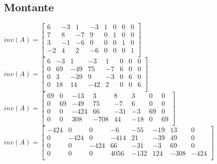 \documentclass[12pt,a4paper,final]{article}
\begin{document}
\subsection{Montante}
$
inv(A)=
\left[\begin{matrix}
6 & -3 & 1 & -3 & 1 & 0 & 0 & 0 \\
7 & 8 & -7 &  9& 0 & 1 & 0 & 0\\
3 & -1 & -6 & 0& 0 & 0 & 1 & 0 \\
-2 & 4 & 2 & -6 & 0 & 0 & 0 & 1\\
\end{matrix}\right]
$
\newline \newline
\newline \newline
$
inv(A)=
\left[\begin{matrix}
6 & -3 & 1 & -3 & 1 & 0 & 0 & 0 \\
0 & 69 & -49 & 75 & -7 & 6 & 0 & 0\\
0 & 3 & -39 & 9 & -3 & 0 & 6 & 0 \\
0 & 18 & 14 & -42 & 2 & 0 & 0 & 6\\
\end{matrix}\right]
$
\newline \newline
\newline \newline
$
inv(A)=
\left[\begin{matrix}
69 & 0 & -13 & 3 & 8 & 3 & 0 & 0 \\
0 & 69 & -49 & 75 & -7 & 6 & 0 & 0\\
0 & 0 & -424 & 66 & -31 & -3 & 69 & 0 \\
0 & 0 & 308 & -708 & 44 & -18 & 0 & 69\\
\end{matrix}\right]
$
\newline \newline
\newline \newline
$
inv(A)=
\left[\begin{matrix}
-424 & 0 & 0 & -6 & -55 & -19 & 13 & 0 \\
0 & -424 & 0 & -414 & 21 & -39 & 49 & 0\\
0 & 0 & -424 & 66 & -31 & -3 & 69 & 0 \\
0 & 0 & 0 & 4056 & -132 & 124 & -308 & -424\\
\end{matrix}\right]
$
\newline \newline
\end{document}
